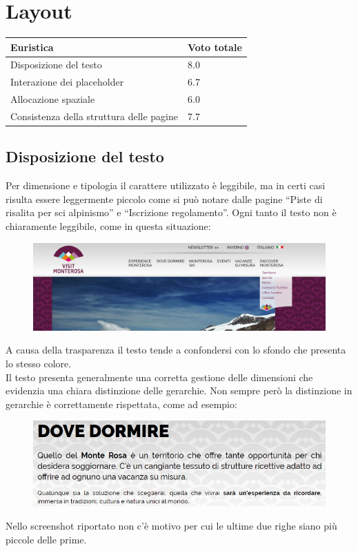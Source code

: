     \section{Layout}
    \begin{table}[H]
        \begin{tabular}{|l|l|}
        \hline \textbf{Euristica} & \textbf{Voto totale} \\ \hline
        Disposizione del testo                      & 8.0 \\ \hline
        Interazione dei placeholder                 & 6.7 \\ \hline
        Allocazione spaziale                        & 6.0 \\ \hline
        Consistenza della struttura delle pagine    & 7.7 \\ \hline
        \hline
        \end{tabular}
        \end{table}
        \subsection{Disposizione del testo}
        Per dimensione e tipologia il carattere utilizzato è leggibile, ma in
        certi casi risulta essere leggermente piccolo come si può notare  dalle
        pagine “Piste di risalita per sci alpinismo” e “Iscrizione regolamento”.
        Ogni tanto il testo non è chiaramente leggibile, come in questa
        situazione:
        \begin{figure}[H]
            \centering
            \includegraphics[scale=0.15]{resources/images/textLayout2.png}
        \end{figure}
        A causa della trasparenza il testo tende a confondersi con lo sfondo che
        presenta lo stesso colore.\\
        Il testo presenta generalmente una corretta gestione delle dimensioni che
        evidenzia una chiara distinzione delle gerarchie. Non sempre però la 
        distinzione in gerarchie è correttamente rispettata, come ad esempio:
        \begin{figure}[H] 
            \centering
            \includegraphics[scale=0.6]{resources/images/textLayout4.jpg}
        \end{figure}
        Nello screenshot riportato non c'è motivo per cui le ultime due righe
        siano più piccole delle prime.

